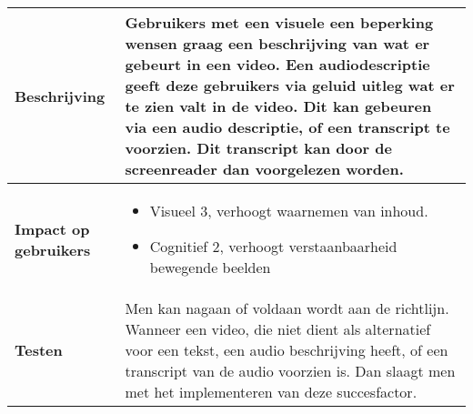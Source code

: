 \begin{table}[H]
\begin{tabular}{|l|p{12cm}|}
        \hline
        \textbf{Beschrijving}                & Gebruikers met een visuele een beperking wensen graag een beschrijving van wat er gebeurt in een video. Een audiodescriptie geeft deze gebruikers via geluid uitleg wat er te zien valt in de video. Dit kan gebeuren via een audio descriptie, of een transcript te voorzien. Dit transcript kan door de screenreader dan voorgelezen worden.\\ 
        \hline
        \textbf{Impact op gebruikers}        & 
        \begin{itemize}
            \item Visueel 3, verhoogt waarnemen van inhoud.    
            \item Cognitief 2, verhoogt verstaanbaarheid bewegende beelden         
        \end{itemize}                                                                                                                   \\ 
      
        \hline
        \textbf{Testen}                      & Men kan nagaan of voldaan wordt aan de richtlijn. Wanneer een video, die niet dient als alternatief voor een tekst, een audio beschrijving heeft, of een transcript van de audio voorzien is. Dan slaagt men met het implementeren van deze succesfactor.                                                                                                                               \\
        \hline
    \end{tabular}
\end{table}





